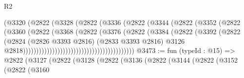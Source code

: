 \begin{lexlean}{R2}
\begin{coremodule}
                                              (@3320
                                                (@2822
                                                  (@3328
                                                    (@2822
                                                      (@3336
                                                        (@2822
                                                          (@3344
                                                            (@2822
                                                              (@3352
                                                                (@2822
                                                                  (@3360
                                                                    (@2822
                                                                      (@3368
                                                                        (@2822
                                                                          (@3376
                                                                            (@2822
                                                                              (@3384
                                                                                (@2822
                                                                                  (@3392
                                                                                    (@2822
                                                                                      (@2824
                                                                                        (@2826
                                                                                          @3393
                                                                                          @2816)
                                                                                        (@2833
                                                                                          @3393
                                                                                          @2816)
                                                                                        @3126
                                                                                        @2818))))))))))))))))))))))))))))))))))))))))))
@3473 := fun (typeId : @15) =>
  @2822
    (@3127
      (@2822
        (@3128
          (@2822
            (@3136
              (@2822
                (@3144
                  (@2822
                    (@3152
                      (@2822
                        (@3160

\end{coremodule}
\end{lexlean}
